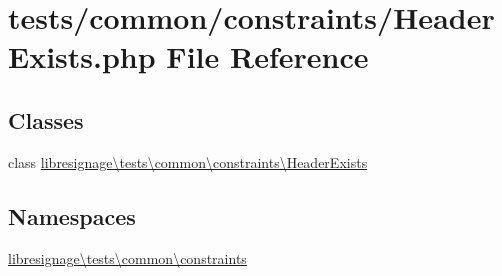 \hypertarget{HeaderExists_8php}{}\section{tests/common/constraints/\+Header\+Exists.php File Reference}
\label{HeaderExists_8php}
\subsection*{Classes}
\begin{DoxyCompactItemize}
\item 
class \hyperlink{classlibresignage_1_1tests_1_1common_1_1constraints_1_1HeaderExists}{libresignage\textbackslash{}tests\textbackslash{}common\textbackslash{}constraints\textbackslash{}\+Header\+Exists}
\end{DoxyCompactItemize}
\subsection*{Namespaces}
\begin{DoxyCompactItemize}
\item 
 \hyperlink{namespacelibresignage_1_1tests_1_1common_1_1constraints}{libresignage\textbackslash{}tests\textbackslash{}common\textbackslash{}constraints}
\end{DoxyCompactItemize}

